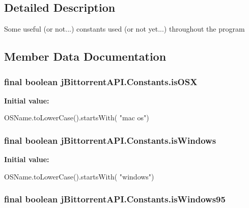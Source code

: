 \subsection{Detailed Description}
Some useful (or not...) constants used (or not yet...) throughout the program 

\subsection{Member Data Documentation}
\hypertarget{classj_bittorrent_a_p_i_1_1_constants_a88e73123ca9147dbe18ecc03ed2c115e}{
\subsubsection[{isOSX}]{\setlength{\rightskip}{0pt plus 5cm}final boolean jBittorrentAPI.Constants.isOSX}}
\label{classj_bittorrent_a_p_i_1_1_constants_a88e73123ca9147dbe18ecc03ed2c115e}
{\bfseries Initial value:}
\begin{DoxyCode}
 OSName.toLowerCase().startsWith(
            "mac os")
\end{DoxyCode}
\hypertarget{classj_bittorrent_a_p_i_1_1_constants_a4954265aa0587f4fde3f45deb196c014}{
\subsubsection[{isWindows}]{\setlength{\rightskip}{0pt plus 5cm}final boolean jBittorrentAPI.Constants.isWindows}}
\label{classj_bittorrent_a_p_i_1_1_constants_a4954265aa0587f4fde3f45deb196c014}
{\bfseries Initial value:}
\begin{DoxyCode}
 OSName.toLowerCase().startsWith(
            "windows")
\end{DoxyCode}
\hypertarget{classj_bittorrent_a_p_i_1_1_constants_a1c508f559c9d497f62f1b576d2afcbfa}{
\subsubsection[{isWindows95}]{\setlength{\rightskip}{0pt plus 5cm}final boolean jBittorrentAPI.Constants.isWindows95}}
